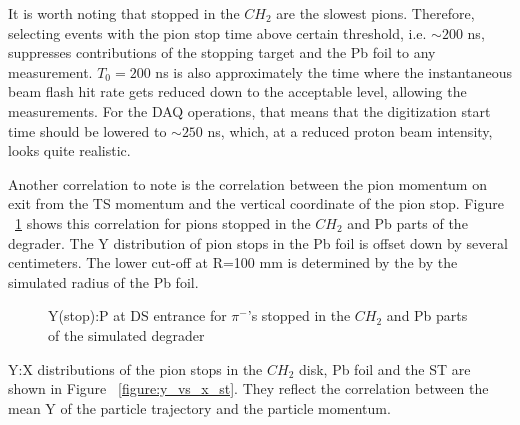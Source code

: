 It is worth noting that stopped in the $CH_2$ are the slowest pions.
Therefore, selecting events with the pion stop time above certain threshold,
i.e. $\sim 200$ ns, suppresses contributions of the stopping target
and the Pb foil to any measurement.
%
$T_0 = 200$ ns is also approximately the time where the instantaneous beam flash 
hit rate gets reduced down to the acceptable level, allowing the measurements.
For the DAQ operations, that means that the digitization start time should
be lowered to $\sim 250$ ns, which, at a reduced proton beam intensity,
looks quite realistic.

Another correlation to note is the correlation between the pion momentum
on exit from the TS momentum and the vertical coordinate of the pion stop.
Figure ~\ref{figure:y_vs_p_deg} shows this correlation for pions stopped
in the $CH_2$ and Pb parts of the degrader.
%
The Y distribution of pion stops in the Pb foil is offset down by several centimeters.
The lower cut-off at R=100 mm is determined by the by the simulated radius of the Pb foil.

\begin{figure}[H]
  \caption{
    \label{figure:y_vs_p_deg}
    Y(stop):P at DS entrance for $\pi^-$'s stopped in the $CH_2$ and Pb parts of the simulated degrader
  }
\end{figure}

Y:X distributions of the pion stops in the $CH_2$ disk, Pb foil and the ST are shown in Figure ~\ref{figure:y_vs_x_st}.
They reflect the correlation between the mean Y of the particle trajectory and the particle momentum.

